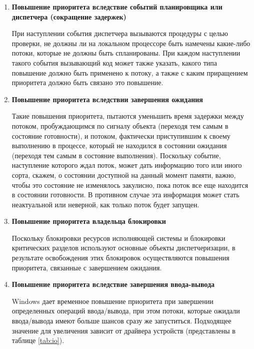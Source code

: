 \begin{enumerate}[label={\arabic*.}]
	\item \textbf{Повышение приоритета вследствие событий планировщика или диспетчера (сокращение задержек)}
	
	При наступлении события диспетчера вызываются процедуры с целью проверки, не должны ли на локальном процессоре быть намечены какие-либо потоки, которые не должны быть спланированы. При каждом наступлении такого события вызывающий код может также указать, какого типа повышение должно быть применено к потоку, а также с каким приращением приоритета должно быть связано это повышение.
	
%	
	
	
	\item \textbf{Повышение приоритета вследствии завершения ожидания}
	
	Такие повышения приоритета, пытаются уменьшить время задержки между потоком, пробуждающимся по сигналу объекта (переходя тем самым в состояние готовности), и потоком, фактически приступившим к своему выполнению в процессе, который не находился в состоянии ожидания (переходя тем самым в состояние выполнения). Поскольку событие, наступление которого ждал поток, может дать информацию того или иного сорта, скажем, о состоянии доступной на данный момент памяти, важно, чтобы это состояние не изменялось закулисно, пока поток все еще находится в состоянии готовности. В противном случае эта информация может стать неактуальной или неверной, как только поток будет запущен.
	
	\item \textbf{Повышение приоритета владельца блокировки}
	
	Поскольку блокировки ресурсов исполняющей системы и блокировки критических разделов используют основные объекты диспетчеризации, в результате освобождения этих блокировок осуществляются повышения приоритета, связанные с завершением ожидания.
	
	\item \textbf{Повышение приоритета вследствие завершения ввода-вывода }
	
	Windows дает временное повышение приоритета при завершении определенных операций ввода/вывода, при этом потоки, которые ожидали ввода/вывода имеют больше шансов сразу же запуститься. Подходящее значение для увеличения зависит от драйвера устройств (представлены в таблице \ref{tab:io}).


\end{enumerate}
